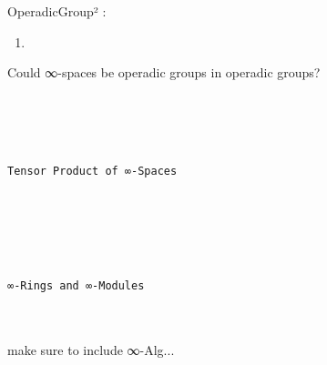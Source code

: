 \documentclass{book}
\theoremstyle{definition}
\renewcommand{\chapter}[1]{
\newpage
{
\Huge 
\begin{center}
\ \\
\ \\
\thispagestyle{empty}
\texttt{#1}
\end{center}}
\ \\
\ \\
}
\begin{document}

OperadicGroup² : 

\begin{enumerate}
\item 
\end{enumerate}

Could ∞-spaces be operadic groups in operadic groups?

\newpage
\ \\




\chapter{Tensor Product of ∞-Spaces}




\chapter{∞-Rings and ∞-Modules}

make sure to include ∞-Alg...

\end{document}
